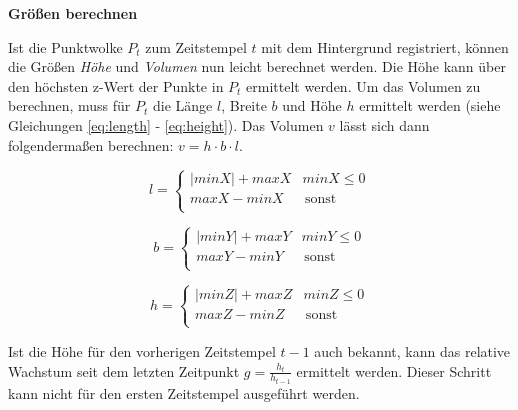 \documentclass[12pt,titlepage, twoside]{article}
\begin{document}
\textbf{Größen berechnen}

Ist die Punktwolke $P_t$ zum Zeitstempel $t$ mit dem Hintergrund registriert, können die Größen \textit{Höhe} und \textit{Volumen} nun leicht berechnet werden.
Die Höhe kann über den höchsten z-Wert der Punkte in $P_t$ ermittelt werden. Um das Volumen zu berechnen, muss für $P_t$ die Länge $l$, Breite $b$ und Höhe $h$ ermittelt werden (siehe Gleichungen \ref{eq:length} - \ref{eq:height}). 
Das Volumen $v$ lässt sich dann folgendermaßen berechnen: $v = h \cdot b \cdot l$.

\begin{equation}
    \label{eq:length}
    l = \left\{
    \begin{array}{ll}
    |minX| + maxX & minX \leq 0 \\
    maxX - minX & \, \textrm{sonst} \\
    \end{array}
    \right. 
\end{equation}

\begin{equation}
    \label{eq:width}
    b = \left\{
    \begin{array}{ll}
    |minY| + maxY & minY \leq 0 \\
    maxY - minY & \, \textrm{sonst} \\
    \end{array}
    \right. 
\end{equation}

\begin{equation}
    \label{eq:height}
    h = \left\{
    \begin{array}{ll}
    |minZ| + maxZ & minZ \leq 0 \\
    maxZ - minZ & \, \textrm{sonst} \\
    \end{array}
    \right. 
\end{equation}

Ist die Höhe für den vorherigen Zeitstempel $t-1$ auch bekannt, kann das relative Wachstum seit dem letzten Zeitpunkt $g=\frac{h_t}{h_{t-1}}$ ermittelt werden. Dieser Schritt kann nicht für den ersten Zeitstempel ausgeführt werden.
\end{document}
